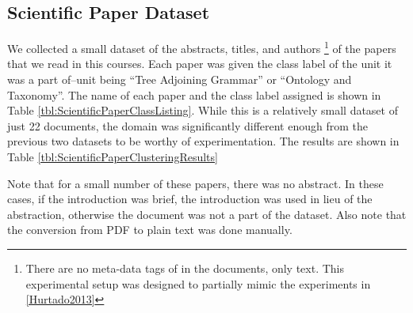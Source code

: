 \documentclass[11pt]{article}
\begin{document}
\subsection{Scientific Paper Dataset} \label{sec:ScientificPaperClustering}

We collected a small dataset of the abstracts, titles, and authors \footnote{There are no meta-data tags of in the documents, only text. This experimental setup was designed to partially mimic the experiments in \ref{Hurtado2013}} of the papers that we read in this courses. Each paper was given the class label of the unit it was a part of--unit being ``Tree Adjoining Grammar'' or ``Ontology and Taxonomy''. The name of each paper and the  class label assigned is shown in Table \ref{tbl:ScientificPaperClassListing}. While this is a relatively small dataset of just 22 documents, the domain was significantly different enough from the previous two datasets to be worthy of experimentation. The results are shown in Table \ref{tbl:ScientificPaperClusteringResults}

Note that for a small number of these papers, there was no abstract. In these cases, if the introduction was brief, the introduction was used in lieu of the abstraction, otherwise the document was not a part of the dataset. Also note that the conversion from PDF to plain text was done manually.
\end{document}
